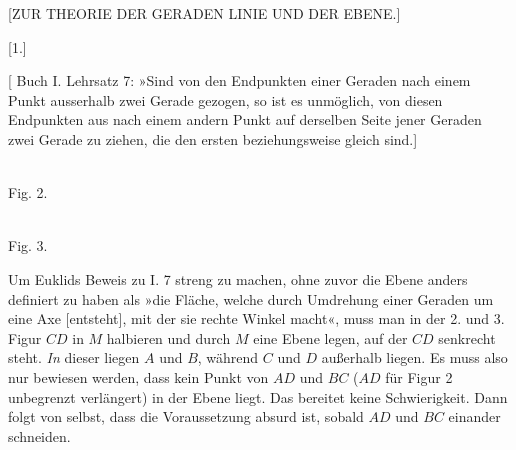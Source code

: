 \clearpage{}
\begin{center}[ZUR THEORIE DER GERADEN LINIE UND DER EBENE.]\end{center}


\begin{center}[1.]\end{center}


[ Buch I. Lehrsatz 7: »Sind von den Endpunkten einer Geraden nach
einem Punkt ausserhalb zwei Gerade gezogen, so ist es unmöglich, von diesen
Endpunkten aus nach einem andern Punkt auf derselben Seite jener Geraden zwei
Gerade zu ziehen, die den ersten beziehungsweise gleich sind.]

\begin{center}
\begin{minipage}[b]{.42\linewidth}\centering\\[3pt]Fig. 2.\end{minipage}\hfill
\begin{minipage}[b]{.42\linewidth}\centering\\[3pt]Fig. 3.\end{minipage}
\end{center}
Um Euklids Beweis zu I. 7 streng zu machen, ohne zuvor die Ebene anders definiert
zu haben als »die Fläche, welche durch Umdrehung einer Geraden um eine Axe
[entsteht], mit der sie rechte Winkel macht«, muss man in der 2. und 3. Figur $CD$
in $M$ halbieren und durch $M$ eine Ebene legen, auf der $CD$ senkrecht steht.
\emph{In} dieser liegen $A$ und $B$, während $C$ und $D$ außerhalb liegen. Es
muss also nur bewiesen werden, dass kein Punkt von $AD$ und $BC$ ($AD$ für
Figur 2 unbegrenzt verlängert) in der Ebene liegt. Das bereitet keine Schwierigkeit.
Dann folgt von selbst, dass die Voraussetzung absurd ist, sobald $AD$ und
$BC$ einander schneiden.

